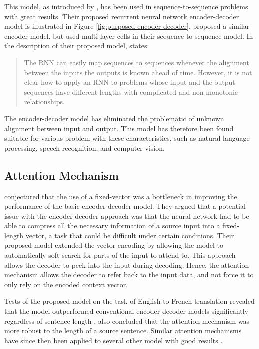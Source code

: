 This model, as introduced by \cite{cho2014learning}, has been used in sequence-to-sequence problems with great results. Their proposed recurrent neural network encoder-decoder model is illustrated in Figure \ref{fig:purposed-encoder-decoder}. \cite{sutskever2014sequence} proposed a similar encoder-model, but used multi-layer cells in their sequence-to-sequence model. In the description of their proposed model, \cite{sutskever2014sequence} states:

\begin{quote}
    The RNN can easily map sequences to sequences whenever the alignment between the inputs the outputs is known ahead of time. However, it is not clear how to apply an RNN to problems whose input and the output sequences have different lengths with complicated and non-monotonic relationships.
\end{quote}

The encoder-decoder model has eliminated the problematic of unknown alignment between input and output. This model has therefore been found suitable for various problem with these characteristics, such as natural language processing, speech recognition, and computer vision.

\subsection{Attention Mechanism}
\label{sec:attention_mechanism}
\cite{bahdanau2014neural} conjectured that the use of a fixed-vector was a bottleneck in improving the performance of the basic encoder-decoder model. They argued that a potential issue with the encoder-decoder approach was that the neural network had to be able to compress all the necessary information of a source input into a fixed-length vector, a task that could be difficult under certain conditions. Their proposed model extended the vector encoding by allowing the model to automatically soft-search for parts of the input to attend to. This approach allows the decoder to peek into the input during decoding. Hence, the attention mechanism allows the decoder to refer back to the input data, and not force it to only rely on the encoded context vector. 

Tests of the proposed model on the task of English-to-French translation revealed that the model outperformed conventional encoder-decoder models significantly regardless of sentence length \citep{bahdanau2014neural}. \cite{bahdanau2014neural} also concluded that the attention mechanism was more robust to the length of a source sentence. Similar attention mechanisms have since then been applied to several other model with good results \citep{hsu2016recurrent, sankaran2016temporal}. 

